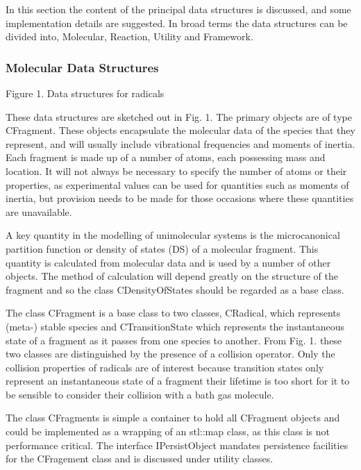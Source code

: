 In this section the content of the principal data structures is discussed, and some implementation details are suggested. In broad terms the data structures can be divided into, Molecular, Reaction, Utility and Framework.

\subsubsection{Molecular Data Structures
}\label{sec:MolecularDataStructures
}

 

Figure 1. Data structures for radicals

These data structures are sketched out in Fig. 1. The primary objects are of type CFragment. These objects encapsulate the molecular data of the species that they represent, and will usually include vibrational frequencies and moments of inertia. Each fragment is made up of a number of atoms, each possessing mass and location. It will not always be necessary to specify the number of atoms or their properties, as experimental values can be used for quantities such as moments of inertia, but provision needs to be made for those occasions where these quantities are unavailable.

A key quantity in the modelling of unimolecular systems is the microcanonical partition function or density of states (DS) of a molecular fragment. This quantity is calculated from molecular data and is used by a number of other objects. The method of calculation will depend greatly on the structure of the fragment and so the class CDensityOfStates should be regarded as a base class.

The class CFragment is a base class to two classes, CRadical, which represents (meta-) stable species and CTransitionState which represents the instantaneous state of a fragment as it passes from one species to another. From Fig. 1. these two classes are distinguished by the presence of a collision operator. Only the collision properties of radicals are of interest because transition states only represent an instantaneous state of a fragment their lifetime is too short for it to be sensible to consider their collision with a bath gas molecule.

The class CFragments is simple a container to hold all CFragment objects and could be implemented as a wrapping of an stl::map class, as this class is not performance critical. The interface IPersistObject mandates persistence facilities for the CFragement class and is discussed under utility classes.

